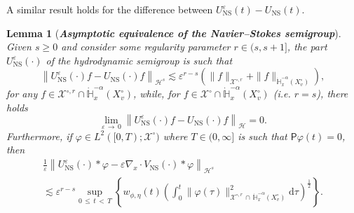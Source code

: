\documentclass[10pt]{amsart}
\newtheorem{lemm}[theo]{Lemma}\newtheorem{prop}[theo]{Proposition}\newtheorem{coro}[theo]{Corollary}\newtheorem{conj}[theo]{Conjecture}
\theoremstyle{definition}\newtheorem{defi}[theo]{Definition}\newtheorem{rema}[theo]{Remark}\newtheorem{exam}[theo]{Example}\newtheorem{exem}[theo]{Example}\newtheorem{nota}[theo]{Notation}
\newcommand{\ns}{\mathrm{NS}}
\renewcommand{\d}{\mathrm{d}}
\newcommand{\bbH}{\mathbb{H}}
\newcommand{\XX}{\mathcal{X}}
\newcommand{\PP}{\mathsf{P}}
\newcommand{\HHH}{\mathscr{H}}
\newcommand{\SSSs}{\HHH}
\newcommand{\rSSSs}[1]{\HHH^{#1}}
\newcommand{\Slm}{X^{\circ}}
\newcommand{\SSlm}{\XX^{\circ}}
\newcommand{\rSSlm}[1]{\XX^{{\circ}, #1}}
\renewcommand*\le{\leqslant}
\renewcommand*\ge{\geqslant}
\newcommand*\eps{{\varepsilon}}
\begin{document}
A similar result holds for the difference between $U^{\eps}_{\ns}(t)-U_{\ns}(t)$.


\begin{lemm}[\emph{\textbf{Asymptotic equivalence of the Navier--Stokes semigroup}}]\label{lem:asymptotic_equiv_NS_semigroup}
Given $s \ge0$ and consider some regularity parameter $r \in (s, s+1]$, the part $U^\eps_\ns(\cdot)$ of the hydrodynamic semigroup is such that
\begin{equation}\label{eq:asymptotic_equiv_NS_reg}
\left\| U^\eps_\ns(\cdot) f - U_\ns(\cdot) f \right\|_{\rSSSs{s}} \lesssim \eps^{r - s} \left(\| f \|_{\rSSlm{r}} + \| f \|_{ \dot{\bbH}^{-\alpha}_x (\Slm_v) } \right),
\end{equation}
for any $f \in \rSSlm{r} \cap \dot{\bbH}^{-\alpha}_x(\Slm_v)$, while, for $f \in \SSlm \cap \dot{\bbH}^{-\alpha}_x (\Slm_v)$ (i.e. $r=s$), there holds
\begin{equation}\label{eq:asymptotic_equiv_NS_general}
\lim_{\eps\,\to \,0}\left\| U^\eps_\ns(\cdot) f - U_\ns(\cdot) f \right\|_\SSSs = 0.
\end{equation}
Furthermore, if $\varphi \in L^2([0, T) ; \SSlm )$ where $T \in (0, \infty]$ is such that $\PP \varphi(t) = 0$, then
\begin{multline}\label{eq:asymptotic_equiv_NS_orthogonal_reg}
\frac{1}{\eps} \left\| U^\eps_\ns(\cdot) * \varphi - \eps \nabla_x \cdot V_\ns(\cdot) * \varphi \right\|_{\rSSSs{s}} \\
\lesssim \eps^{r - s} \sup_{0\,\le\,t\,<\,T} \left\{w_{\phi, \eta}(t) \left(\int_0^t \| \varphi(\tau) \|_{ \rSSlm{r}\,\cap\,\dot{\bbH}^{-\alpha}_x (\Slm_v) }^2 \d \tau \right)^{\frac{1}{2}} \right\}.
\end{multline}
\end{lemm}
\end{document}
